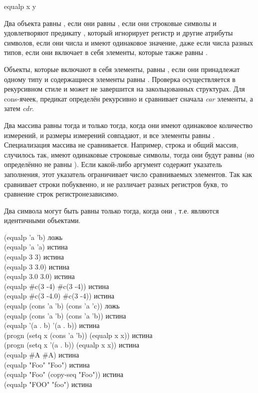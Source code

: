 \begin{defun}[Функция]
equalp x y

Два объекта равны , если они равны ,
если они строковые символы и удовлетворяют предикату , который
игнорирует регистр и другие атрибуты символов,
если они числа и имеют одинаковое значение, даже если числа разных типов,
если они включает в себя элементы, которые также равны .

Объекты, которые включают в себя элементы, равны , если они
принадлежат одному типу и содержащиеся элементы равны .
Проверка осуществляется в рекурсивном стиле и может не завершится на
закольцованных структурах.
Для cons-ячеек, предикат  определён рекурсивно и сравнивает сначала
\emph{car} элементы, а затем \emph{cdr}.

Два массива равны  тогда и только тогда, когда они имеют одинаковое
количество измерений, и размеры измерений совпадают, и все элементы равны
. Специализация массива не сравнивается. Например,
строка и общий массив, случилось так, имеют одинаковые строковые символы,
тогда они будут равны  (но определённо не равны ).
Если какой-либо аргумент содержит указатель заполнения, этот указатель
ограничивает число сравниваемых элементов. Так как  сравнивает
строки побуквенно, и не различает разных регистров букв, то сравнение строк
регистронезависимо.

Два символа могут быть равны  только тогда, когда они ,
т.е. являются идентичными объектами.

\begin{lisp}
(equalp 'a 'b) \textrm{ложь} \\
(equalp 'a 'a) \textrm{истина} \\
(equalp 3 3) \textrm{истина} \\
(equalp 3 3.0) \textrm{истина} \\
(equalp 3.0 3.0) \textrm{истина} \\
(equalp \#c(3 -4) \#c(3 -4)) \textrm{истина} \\
(equalp \#c(3 -4.0) \#c(3 -4)) \textrm{истина} \\
(equalp (cons 'a 'b) (cons 'a 'c)) \textrm{ложь} \\
(equalp (cons 'a 'b) (cons 'a 'b)) \textrm{истина} \\
(equalp '(a . b) '(a . b)) \textrm{истина} \\
(progn (setq x (cons 'a 'b)) (equalp x x)) \textrm{истина} \\
(progn (setq x '(a . b)) (equalp x x)) \textrm{истина} \\
(equalp \#{\Xbackslash}A \#{\Xbackslash}A) \textrm{истина} \\
(equalp "Foo" "Foo") \textrm{истина} \\
(equalp "Foo" (copy-seq "Foo")) \textrm{истина} \\
(equalp "FOO" "foo") \textrm{истина}
\end{lisp}
\end{defun}

